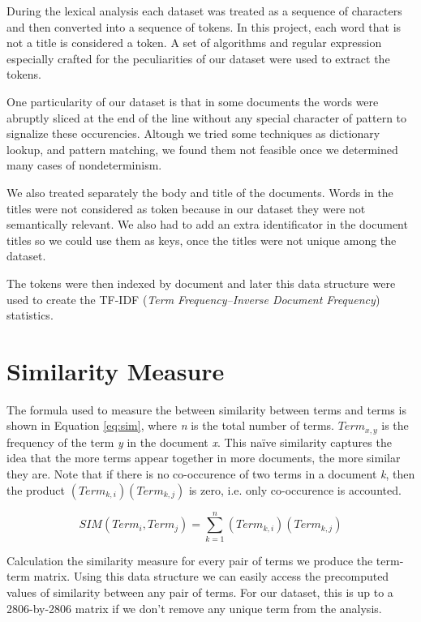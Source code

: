 \documentclass{article}
\begin{document}
During the lexical analysis each dataset was treated as a sequence of characters and then converted into a sequence of tokens. In this project, each word that is not a title is considered a token. A set of algorithms and regular expression especially crafted for the peculiarities of our dataset were used to extract the tokens.

One particularity of our dataset is that in some documents the words were abruptly sliced at the end of the line without any special character of pattern to signalize these occurencies. Altough we tried some techniques as dictionary lookup, and pattern matching, we found them not feasible once we determined many cases of nondeterminism.

We also treated separately the body and title of the documents. Words in the titles were not considered as token because in our dataset they were not semantically relevant. We also had to add an extra identificator in the document titles so we could use them as keys, once the titles were not unique among the dataset.

The tokens were then indexed by document and later this data structure were used to create  the TF-IDF (\emph{Term Frequency–Inverse Document Frequency}) statistics.

\section{Similarity Measure}

The formula used to measure the between similarity between terms and terms is shown in Equation \ref{eq:sim}, where \emph{n} is the total number of terms. $Term_{x,y}$ is the frequency of the term \emph{y} in the document \emph{x}. This naïve similarity captures the idea that the more terms appear together in more documents, the more similar they are. Note that if there is no co-occurence of two terms in a document \emph{k}, then the product $(Term_{k,i})(Term_{k,j})$ is zero, i.e. only co-occurence is accounted.

\begin{equation} \label{eq:sim}
SIM(Term_{i}, Term_{j}) = \sum\limits_{k=1}^n (Term_{k,i})(Term_{k,j})
\end{equation}

Calculation the similarity measure for every pair of terms we produce the term-term matrix. Using this data structure we can easily access the precomputed values of similarity between any pair of terms. For our dataset, this is up to a 2806-by-2806 matrix if we don't remove any unique term from the analysis.
\end{document}
